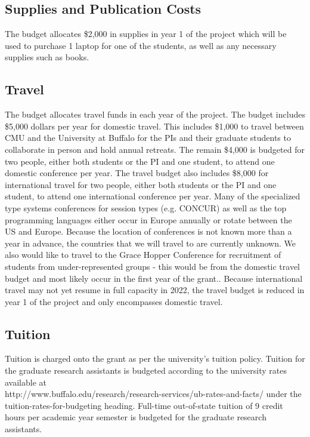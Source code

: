 \subsection*{Supplies and Publication Costs}
The budget allocates \$2,000 in supplies in year 1 of the project which will
be used to purchase 1 laptop for one of the students, as well
as any necessary supplies such as books. 

\subsection*{Travel}
The budget allocates travel funds in each year of the project. 
The budget includes \$5,000 dollars per year for domestic travel.  This includes \$1,000 to travel between CMU and the University at Buffalo for the PIs and
their graduate students to collaborate in person and hold annual retreats.  The remain \$4,000 is budgeted for two people, either both students or the PI and
one student, to attend one domestic conference per year.   The travel budget also includes \$8,000 for international travel for two people, either both students or the PI and
one student, to attend one international conference per year.  Many of the specialized type systems
conferences for session types (e.g. CONCUR) as well as the top programming languages either occur in Europe annually or rotate between the US and Europe.  
 Because the location of conferences is not known more than
a year in advance, the countries that we will travel to are currently unknown.
We also would like to travel to the Grace Hopper
Conference for recruitment of students from under-represented groups - this would be from the domestic travel budget and most likely occur in the first year of the grant..
Because international travel may not yet resume in full capacity in 2022, the travel budget is reduced in year 1 of the project and only encompasses domestic travel.


\subsection*{Tuition}
Tuition is charged onto the grant as per the university's tuition policy.
Tuition for the graduate research assistants is budgeted according to the
university 
rates available at\\
http://www.buffalo.edu/research/research-services/ub-rates-and-facts/
under the tuition-rates-for-budgeting heading.
Full-time out-of-state tuition of 9 credit
hours per academic year semester is budgeted for the graduate research assistants.

